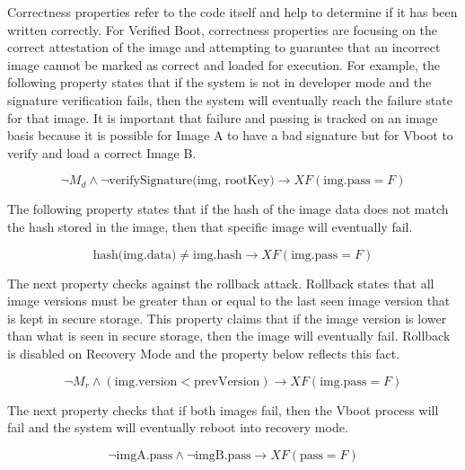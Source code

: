 \documentclass[../report.tex]{subfiles}
\begin{document}
Correctness properties refer to the code itself and help to determine if it has been written correctly.
For Verified Boot, correctness properties are focusing on the correct attestation of the image and attempting to guarantee that an incorrect image cannot be marked as correct and loaded for execution.
For example, the following property states that if the system is not in developer mode and the signature verification fails, then the system will eventually reach the failure state for that image.
It is important that failure and passing is tracked on an image basis because it is possible for Image A to have a bad signature but for Vboot to verify and load a correct Image B.

\begin{equation} \label{eq:sig_cor}
 \lnot M_d \land \lnot \text{verifySignature(img, rootKey)} \to XF (\text{img.pass} = F)
\end{equation}

The following property states that if the hash of the image data does not match the hash stored in the image, then that specific image will eventually fail.

\begin{equation} \label{eq:hash_cor}
    \text{hash(img.data)} \neq \text{img.hash} \to XF (\text{img.pass} = F)
\end{equation}

The next property checks against the rollback attack. 
Rollback states that all image versions must be greater than or equal to the last seen image version that is kept in secure storage. 
This property claims that if the image version is lower than what is seen in secure storage, then the image will eventually fail.
Rollback is disabled on Recovery Mode and the property below reflects this fact.

\begin{equation} \label{eq:rollback}
    \lnot M_r \land (\text{img.version} < \text{prevVersion}) \to XF (\text{img.pass} = F)
\end{equation}

The next property checks that if both images fail, then the Vboot process will fail and the system will eventually reboot into recovery mode.

\begin{equation} \label{eq:both-fail}
    \lnot \text{imgA.pass} \land \lnot \text{imgB.pass} \to XF (\text{pass} = F)
\end{equation}
\end{document}

